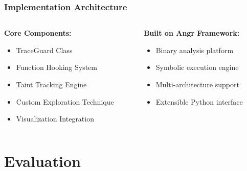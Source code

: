\documentclass[aspectratio=169]{beamer}
\begin{document}
\begin{frame}
    \frametitle{Implementation Architecture}
    \begin{columns}
        \begin{column}{0.5\textwidth}
            \textbf{Core Components:}
            \begin{itemize}
                \item TraceGuard Class
                \item Function Hooking System
                \item Taint Tracking Engine
                \item Custom Exploration Technique
                \item Visualization Integration
            \end{itemize}
        \end{column}
        \begin{column}{0.5\textwidth}
            \textbf{Built on Angr Framework:}
            \begin{itemize}
                \item Binary analysis platform
                \item Symbolic execution engine
                \item Multi-architecture support
                \item Extensible Python interface
            \end{itemize}
        \end{column}
    \end{columns}
\end{frame}

\section{Evaluation}
\end{document}
